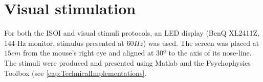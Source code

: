 \section{Visual stimulation}
\label{sec:Visual-stimulation}

For both the ISOI and visual stimuli protocols, an LED display (BenQ XL2411Z, 144-Hz monitor, stimulus presented at $60 Hz$) was used. The screen was placed at $15 cm$ from the mouse's right eye and  aligned at $30º$ to the axis of its nose-line. The stimuli were produced and presented using Matlab and the Psychophysics Toolbox (see \ref{cap:TechnicalImplementations}. 
